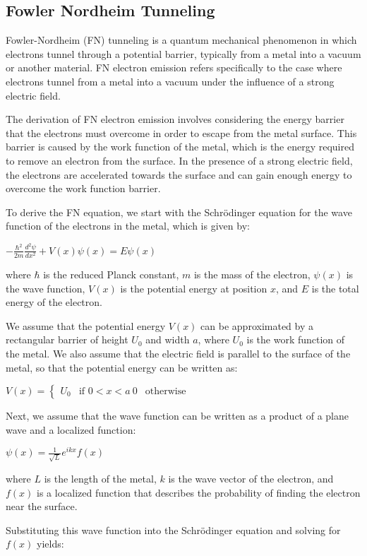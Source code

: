 \subsection{Fowler Nordheim Tunneling}
Fowler-Nordheim (FN) tunneling is a quantum mechanical phenomenon in which electrons tunnel through a potential barrier, typically from a metal into a vacuum or another material. FN electron emission refers specifically to the case where electrons tunnel from a metal into a vacuum under the influence of a strong electric field.

The derivation of FN electron emission involves considering the energy barrier that the electrons must overcome in order to escape from the metal surface. This barrier is caused by the work function of the metal, which is the energy required to remove an electron from the surface. In the presence of a strong electric field, the electrons are accelerated towards the surface and can gain enough energy to overcome the work function barrier.

To derive the FN equation, we start with the Schrödinger equation for the wave function of the electrons in the metal, which is given by:

$ -\frac{\hbar^2}{2m}\frac{d^2\psi}{dx^2} + V(x)\psi(x) = E\psi(x) $

where $\hbar$ is the reduced Planck constant, $m$ is the mass of the electron, $\psi(x)$ is the wave function, $V(x)$ is the potential energy at position $x$, and $E$ is the total energy of the electron.

We assume that the potential energy $V(x)$ can be approximated by a rectangular barrier of height $U_0$ and width $a$, where $U_0$ is the work function of the metal. We also assume that the electric field is parallel to the surface of the metal, so that the potential energy can be written as:

$ V(x) = \begin{cases} U_0 &\text{if } 0 < x < a \ 0 &\text{otherwise} \end{cases} $

Next, we assume that the wave function can be written as a product of a plane wave and a localized function:

$ \psi(x) = \frac{1}{\sqrt{L}} e^{ikx} f(x) $

where $L$ is the length of the metal, $k$ is the wave vector of the electron, and $f(x)$ is a localized function that describes the probability of finding the electron near the surface.

Substituting this wave function into the Schrödinger equation and solving for $f(x)$ yields:


